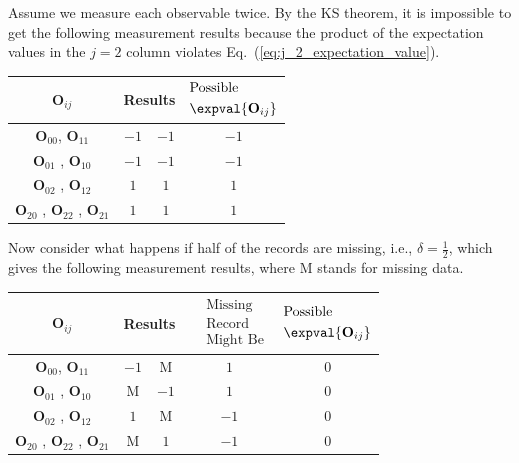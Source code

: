 \documentclass[english,reprint, aps, prl,superscriptaddress, showpacs,
showkeys, longbibliography, amsmath, amssymb, floatfix]{revtex4-1}
\theoremstyle{plain}
\theoremstyle{definition}
\newcommand{\missing}{\text{M}}
\begin{document}
Assume we measure each observable twice. By the KS theorem, it is
impossible to get the following measurement results because the product
of the expectation values in the $j=2$ column violates Eq.~(\ref{eq:j_2_expectation_value}).
\begin{center}
\begin{tabular}{cccc}
\toprule 
\addlinespace
$\mathbf{O}_{ij}$  & \multicolumn{2}{c}{Results} & $\begin{aligned} & \textrm{Possible}\\
 & \expval{\mathbf{O}_{ij}}
\end{aligned}
$\tabularnewline
\midrule
\midrule 
\addlinespace
$\mathbf{O}_{00}$, $\mathbf{O}_{11}$ & $-1$ & $-1$ & $-1$\tabularnewline
\midrule 
\addlinespace
$\mathbf{O}_{01}$ , $\mathbf{O}_{10}$  & $-1$ & $-1$ & $-1$\tabularnewline
\midrule 
\addlinespace
$\mathbf{O}_{02}$ , $\mathbf{O}_{12}$ & $1$ & $1$ & $1$\tabularnewline
\midrule 
\addlinespace
$\mathbf{O}_{20}$ , $\mathbf{O}_{22}$ , $\mathbf{O}_{21}$  & $1$ & $1$ & $1$\tabularnewline
\bottomrule
\end{tabular}
\par\end{center}

Now consider what happens if half of the records are missing, i.e.,
$\delta=\frac{1}{2}$, which gives the following measurement results,
where $\missing$ stands for missing data.
\begin{center}
\begin{tabular}{ccccc}
\toprule 
\addlinespace
$\mathbf{O}_{ij}$  & \multicolumn{2}{c}{Results} & $\begin{aligned} & \textrm{Missing}\\
 & \textrm{Record}\\
 & \textrm{Might Be}
\end{aligned}
$ & $\begin{aligned} & \textrm{Possible}\\
 & \expval{\mathbf{O}_{ij}}
\end{aligned}
$\tabularnewline
\midrule
\midrule 
\addlinespace
$\mathbf{O}_{00}$, $\mathbf{O}_{11}$ & $-1$ & $\missing$ & $1$ & $0$\tabularnewline
\midrule 
\addlinespace
$\mathbf{O}_{01}$ , $\mathbf{O}_{10}$  & $\missing$ & $-1$ & $1$ & $0$\tabularnewline
\midrule 
\addlinespace
$\mathbf{O}_{02}$ , $\mathbf{O}_{12}$ & $1$ & $\missing$ & $-1$ & $0$\tabularnewline
\midrule 
\addlinespace
$\mathbf{O}_{20}$ , $\mathbf{O}_{22}$ , $\mathbf{O}_{21}$  & $\missing$ & $1$ & $-1$ & $0$\tabularnewline
\bottomrule
\end{tabular}
\par\end{center}
\end{document}
